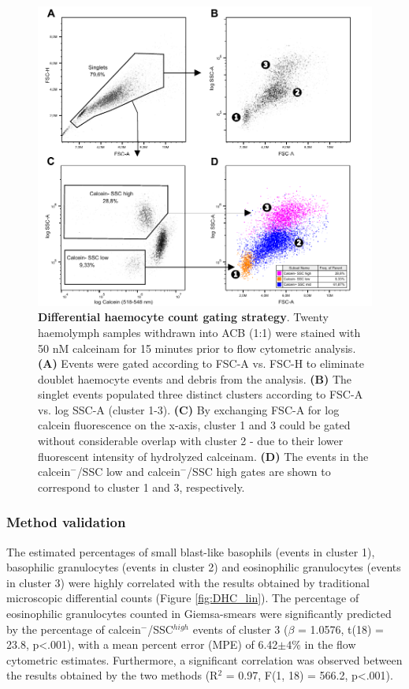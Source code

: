 \begin{figure}[H]
    \centering
    \includegraphics[width=1.0\textwidth]{figures/Gating strategy/SSC Calcein gatestrat full PNG.pdf}
    \caption{ \textbf{Differential haemocyte count gating strategy}. Twenty haemolymph samples withdrawn into ACB (1:1) were stained with 50 nM \acrshort{calceinam} for 15 minutes prior to flow cytometric analysis. \textbf{(A)} Events were gated according to FSC-A vs. FSC-H to eliminate doublet haemocyte events and debris from the analysis. \textbf{(B)} The singlet events populated three distinct clusters according to FSC-A vs. log SSC-A (cluster 1-3). \textbf{(C)} By exchanging FSC-A for log calcein fluorescence on the x-axis, cluster 1 and 3 could be gated without considerable overlap with cluster 2 - due to their lower fluorescent intensity of hydrolyzed \acrshort{calceinam}. \textbf{(D)} The events in the calcein$^{-}$/SSC low and calcein$^{-}$/SSC high gates are shown to correspond to cluster 1 and 3, respectively.}
    \label{fig:DHC_gatestrat}
\end{figure}

\subsubsection{Method validation}
The estimated percentages of small blast-like basophils (events in cluster 1), basophilic granulocytes (events in cluster 2) and eosinophilic granulocytes (events in cluster 3) were highly correlated with the results obtained by traditional microscopic differential counts (Figure \ref{fig:DHC_lin}). The percentage of eosinophilic granulocytes counted in Giemsa-smears were significantly predicted by the percentage of calcein$^{-}$/SSC$^{high}$ events of cluster 3 ($\beta$ = 1.0576, t(18) = 23.8, p<.001), with a mean percent error (MPE) of 6.42$\pm{4}$\% in the flow cytometric estimates. Furthermore, a significant correlation was observed between the results obtained by the two methods (R$^{2}$ = 0.97, F(1, 18) = 566.2, p<.001).

